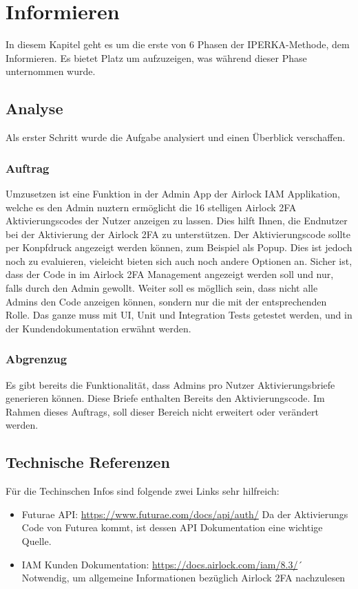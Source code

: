 \chapter{Informieren}\label{ch:informieren}

In diesem Kapitel geht es um die erste von 6 Phasen der IPERKA-Methode, dem Informieren. Es bietet Platz um aufzuzeigen, was während dieser Phase unternommen wurde.

\section{Analyse}
Als erster Schritt wurde die Aufgabe analysiert und einen Überblick verschaffen.
\subsection*{Auftrag}
Umzusetzen ist eine Funktion in der Admin App der Airlock IAM Applikation, welche es den Admin nuztern ermöglicht die 16 stelligen Airlock 2FA Aktivierungscodes der Nutzer anzeigen zu lassen. Dies hilft Ihnen, die Endnutzer bei der Aktivierung der Airlock 2FA zu unterstützen. Der Aktivierungscode sollte per Konpfdruck angezeigt werden können, zum Beispiel als Popup. Dies ist jedoch noch zu evaluieren, vieleicht bieten sich auch noch andere Optionen an. Sicher ist, dass der Code in im Airlock 2FA Management angezeigt werden soll und nur, falls durch den Admin gewollt. \newline
Weiter soll es mögllich sein, dass nicht alle Admins den Code anzeigen können, sondern nur die mit der entsprechenden Rolle. \newline
Das ganze muss mit UI, Unit und Integration Tests getestet werden, und in der Kundendokumentation erwähnt werden.

\subsection*{Abgrenzug}
Es gibt bereits die Funktionalität, dass Admins pro Nutzer Aktivierungsbriefe generieren können. Diese Briefe enthalten Bereits den Aktivierungscode. Im Rahmen dieses Auftrags, soll dieser Bereich nicht erweitert oder verändert werden.

\section{Technische Referenzen}
Für die Techinschen Infos sind folgende zwei Links sehr hilfreich:
\begin{itemize}
	\item Futurae API: \url{https://www.futurae.com/docs/api/auth/}\newline
	 Da der Aktivierungs Code von Futurea kommt, ist dessen API Dokumentation eine wichtige Quelle.
	\item IAM Kunden Dokumentation: \url{https://docs.airlock.com/iam/8.3/}´
	Notwendig, um allgemeine Informationen bezüglich Airlock 2FA nachzulesen
\end{itemize}

